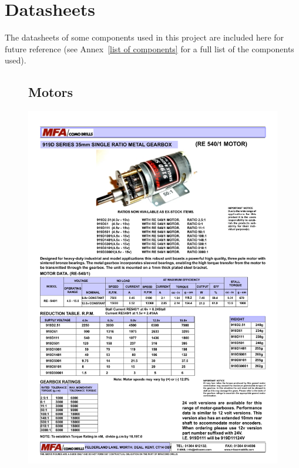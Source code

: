 \chapter{Datasheets}\label{datasheets}\label{section \thechapter}
The datasheets of some components used in this project are included here for future reference (see Annex~\ref{list of components} for a full list of the components used).

\newpage

\begin{figure}
    \section{Motors}\label{ds:motors}
    \centering
    \includegraphics[height=\textheight,trim={1cm 0 0 0}]{Files/919Dseries_1}
\end{figure}
